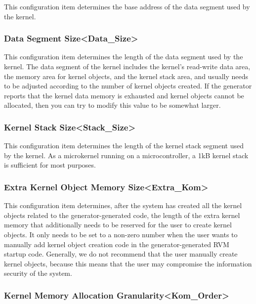 This configuration item determines the base address of the data segment used by the kernel.

\subsubsection{Data Segment Size<Data\_Size>{}}\label{subsubsec:5-3-12-4}

This configuration item determines the length of the data segment used by the kernel. The data segment of the kernel includes the kernel's read-write data area, the memory area for kernel objects, and the kernel stack area, and usually needs to be adjusted according to the number of kernel objects created. If the generator reports that the kernel data memory is exhausted and kernel objects cannot be allocated, then you can try to modify this value to be somewhat larger.

\subsubsection{Kernel Stack Size<Stack\_Size>{}}\label{subsubsec:5-3-12-5}

This configuration item determines the length of the kernel stack segment used by the kernel. As a microkernel running on a microcontroller, a 1kB kernel stack is sufficient for most purposes.

\subsubsection{Extra Kernel Object Memory Size<Extra\_Kom>{}}\label{subsubsec:5-3-12-6}

This configuration item determines, after the system has created all the kernel objects related to the generator-generated code, the length of the extra kernel memory that additionally needs to be reserved for the user to create kernel objects. It only needs to be set to a non-zero number when the user wants to manually add kernel object creation code in the generator-generated RVM startup code. Generally, we do not recommend that the user manually create kernel objects, because this means that the user may compromise the information security of the system.

\subsubsection{Kernel Memory Allocation Granularity<Kom\_Order>{}}\label{subsubsec:5-3-12-7}

